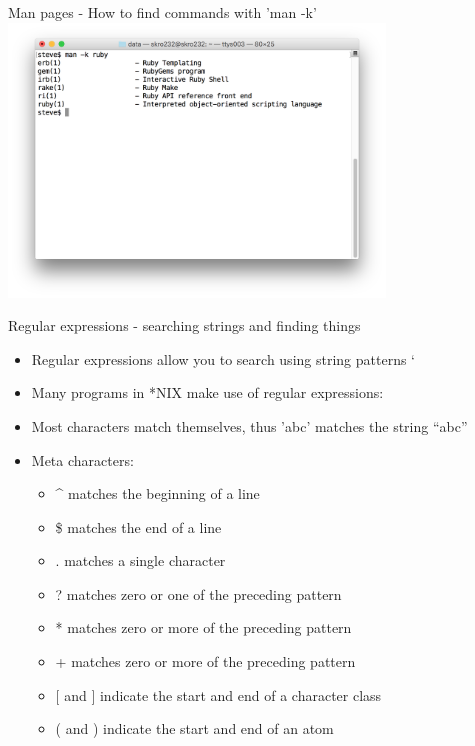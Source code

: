 \documentclass[t]{beamer}
\begin{document}
\begin{frame}{Man pages - How to find commands with 'man -k'}
  \includegraphics[width=10cm,scale=0.4]{images/man-k.png}
\end{frame}

\begin{frame}{Regular expressions - searching strings and finding things}
  \begin{itemize}
  \item Regular expressions allow you to search using string patterns
` \item Many programs in *NIX make use of regular expressions:
  \item Most characters match themselves, thus 'abc' matches the
    string  ``abc''
  \item Meta characters:
    \begin{itemize}
    \item \^{ }  matches the beginning of a line
    \item \$ matches the end of a line
    \item . matches a single character
    \item ? matches zero or one of the preceding pattern
    \item * matches zero or more of the preceding pattern
    \item + matches zero or more of the preceding pattern
    \item $\lbrack$ and $\rbrack$ indicate the start and end of a character class
    \item ( and ) indicate the start and end of an atom
    \end{itemize}
  \end{itemize}
\end{frame}
\end{document}
